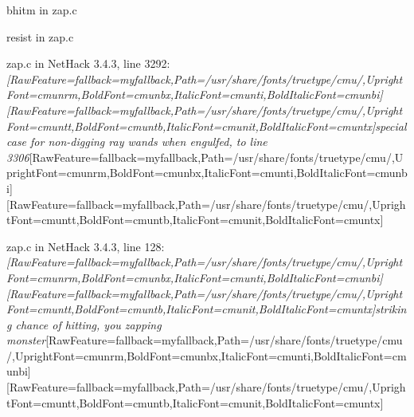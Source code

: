 \begin{myenumerate}
\item{} bhitm\footnotemark[213] in zap.c\footnotemark[214]

\item{} resist\footnotemark[215] in zap.c\footnotemark[216]

\item{} zap.c in NetHack 3.4.3, line 3292\footnotemark[217]: {\itshape \allowbreak{}\setmainfont{cmunti.ttf}[RawFeature={fallback=myfallback},Path=/usr/share/fonts/truetype/cmu/,UprightFont=cmunrm,BoldFont=cmunbx,ItalicFont=cmunti,BoldItalicFont=cmunbi]\setmonofont{cmunti.ttf}[RawFeature={fallback=myfallback},Path=/usr/share/fonts/truetype/cmu/,UprightFont=cmuntt,BoldFont=cmuntb,ItalicFont=cmunit,BoldItalicFont=cmuntx]\itshape special case for non-{}digging ray wands when engulfed, to line 3306}\allowbreak{}\setmainfont{cmunrm.ttf}[RawFeature={fallback=myfallback},Path=/usr/share/fonts/truetype/cmu/,UprightFont=cmunrm,BoldFont=cmunbx,ItalicFont=cmunti,BoldItalicFont=cmunbi]\setmonofont{cmunrm.ttf}[RawFeature={fallback=myfallback},Path=/usr/share/fonts/truetype/cmu/,UprightFont=cmuntt,BoldFont=cmuntb,ItalicFont=cmunit,BoldItalicFont=cmuntx]
     

\item{} zap.c in NetHack 3.4.3, line 128\footnotemark[218]: {\itshape \allowbreak{}\setmainfont{cmunti.ttf}[RawFeature={fallback=myfallback},Path=/usr/share/fonts/truetype/cmu/,UprightFont=cmunrm,BoldFont=cmunbx,ItalicFont=cmunti,BoldItalicFont=cmunbi]\setmonofont{cmunti.ttf}[RawFeature={fallback=myfallback},Path=/usr/share/fonts/truetype/cmu/,UprightFont=cmuntt,BoldFont=cmuntb,ItalicFont=cmunit,BoldItalicFont=cmuntx]\itshape striking chance of hitting, you zapping monster}\allowbreak{}\setmainfont{cmunrm.ttf}[RawFeature={fallback=myfallback},Path=/usr/share/fonts/truetype/cmu/,UprightFont=cmunrm,BoldFont=cmunbx,ItalicFont=cmunti,BoldItalicFont=cmunbi]\setmonofont{cmunrm.ttf}[RawFeature={fallback=myfallback},Path=/usr/share/fonts/truetype/cmu/,UprightFont=cmuntt,BoldFont=cmuntb,ItalicFont=cmunit,BoldItalicFont=cmuntx]
     


\end{myenumerate}
